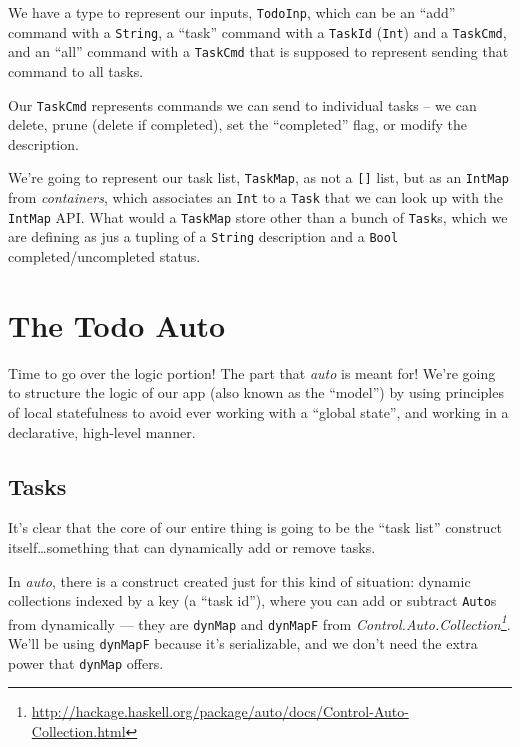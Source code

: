 \documentclass[]{article}
\renewcommand{\href}[2]{#2\footnote{\url{#1}}}
\begin{document}
We have a type to represent our inputs, \texttt{TodoInp}, which can be an
``add'' command with a \texttt{String}, a ``task'' command with a
\texttt{TaskId} (\texttt{Int}) and a \texttt{TaskCmd}, and an ``all'' command
with a \texttt{TaskCmd} that is supposed to represent sending that command to
all tasks.

Our \texttt{TaskCmd} represents commands we can send to individual tasks -- we
can delete, prune (delete if completed), set the ``completed'' flag, or modify
the description.

We're going to represent our task list, \texttt{TaskMap}, as not a
\texttt{{[}{]}} list, but as an \texttt{IntMap} from \emph{containers}, which
associates an \texttt{Int} to a \texttt{Task} that we can look up with the
\texttt{IntMap} API. What would a \texttt{TaskMap} store other than a bunch of
\texttt{Task}s, which we are defining as jus a tupling of a \texttt{String}
description and a \texttt{Bool} completed/uncompleted status.

\section{The Todo Auto}\label{the-todo-auto}

Time to go over the logic portion! The part that \emph{auto} is meant for! We're
going to structure the logic of our app (also known as the ``model'') by using
principles of local statefulness to avoid ever working with a ``global state'',
and working in a declarative, high-level manner.

\subsection{Tasks}\label{tasks}

It's clear that the core of our entire thing is going to be the ``task list''
construct itself\ldots something that can dynamically add or remove tasks.

In \emph{auto}, there is a construct created just for this kind of situation:
dynamic collections indexed by a key (a ``task id''), where you can add or
subtract \texttt{Auto}s from dynamically --- they are \texttt{dynMap} and
\texttt{dynMapF} from
\emph{\href{http://hackage.haskell.org/package/auto/docs/Control-Auto-Collection.html}{Control.Auto.Collection}}.
We'll be using \texttt{dynMapF} because it's serializable, and we don't need the
extra power that \texttt{dynMap} offers.
\end{document}

